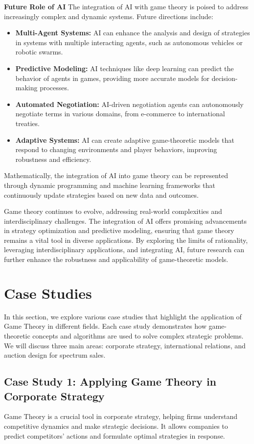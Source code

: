 \documentclass[12pt]{book} %
\begin{document}
\textbf{Future Role of AI}
The integration of AI with game theory is poised to address increasingly complex and dynamic systems. Future directions include:

\begin{itemize}
    \item \textbf{Multi-Agent Systems:} AI can enhance the analysis and design of strategies in systems with multiple interacting agents, such as autonomous vehicles or robotic swarms.
    \item \textbf{Predictive Modeling:} AI techniques like deep learning can predict the behavior of agents in games, providing more accurate models for decision-making processes.
    \item \textbf{Automated Negotiation:} AI-driven negotiation agents can autonomously negotiate terms in various domains, from e-commerce to international treaties.
    \item \textbf{Adaptive Systems:} AI can create adaptive game-theoretic models that respond to changing environments and player behaviors, improving robustness and efficiency.
\end{itemize}

Mathematically, the integration of AI into game theory can be represented through dynamic programming and machine learning frameworks that continuously update strategies based on new data and outcomes.

Game theory continues to evolve, addressing real-world complexities and interdisciplinary challenges. The integration of AI offers promising advancements in strategy optimization and predictive modeling, ensuring that game theory remains a vital tool in diverse applications. By exploring the limits of rationality, leveraging interdisciplinary applications, and integrating AI, future research can further enhance the robustness and applicability of game-theoretic models.


\section{Case Studies}
In this section, we explore various case studies that highlight the application of Game Theory in different fields. Each case study demonstrates how game-theoretic concepts and algorithms are used to solve complex strategic problems. We will discuss three main areas: corporate strategy, international relations, and auction design for spectrum sales.

\subsection{Case Study 1: Applying Game Theory in Corporate Strategy}
Game Theory is a crucial tool in corporate strategy, helping firms understand competitive dynamics and make strategic decisions. It allows companies to predict competitors' actions and formulate optimal strategies in response.
\end{document}

